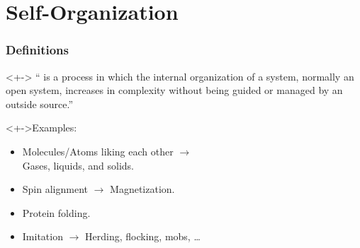 
\section{Self-Organization}

\begin{frame}
  \frametitle{Definitions}

  \begin{block}<+->{}
    `` 
    is a process in which the internal organization 
    of a system, normally an open system, increases in complexity without 
    being guided or managed by an outside source.''
  \end{block}

  \medskip



   \begin{block}<+->{Examples:}
     \begin{itemize}
     \item
       Molecules/Atoms liking each other $\rightarrow$ \\
       \mbox{} \hfill Gases, liquids, and solids.
     \item
       Spin alignment $\rightarrow$ Magnetization.
     \item 
       Protein folding.
     \item 
       Imitation $\rightarrow$ Herding, flocking, mobs, \ldots
     \end{itemize}

     \medskip

   \end{block}

 \end{frame}

